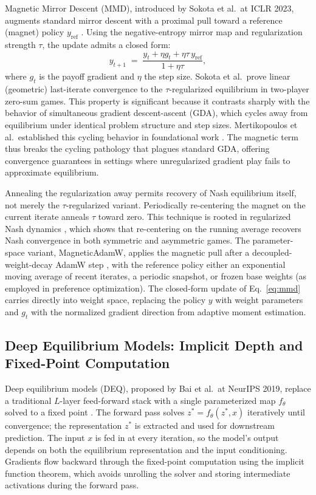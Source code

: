 Magnetic Mirror Descent (MMD), introduced by Sokota et al.\ at ICLR 2023, augments standard mirror descent
with a proximal pull toward a reference (magnet) policy $y_{\mathrm{ref}}$ \citep{Sokota2023}.
Using the negative-entropy mirror map and regularization strength $\tau$, the update admits a closed form:
\begin{equation}
y_{t+1} \;=\; \frac{y_t + \eta g_t + \eta\tau\, y_{\mathrm{ref}}}{1 + \eta\tau},
\label{eq:mmd}
\end{equation}
where $g_t$ is the payoff gradient and $\eta$ the step size.
Sokota et al.\ prove linear (geometric) last-iterate convergence to the $\tau$-regularized equilibrium in
two-player zero-sum games.
This property is significant because it contrasts sharply with the behavior of simultaneous gradient
descent-ascent (GDA), which cycles away from equilibrium under identical problem structure and step sizes.
Mertikopoulos et al.\ established this cycling behavior in foundational work \citep{Mertikopoulos2018}.
The magnetic term thus breaks the cycling pathology that plagues standard GDA, offering convergence guarantees
in settings where unregularized gradient play fails to approximate equilibrium.

Annealing the regularization away permits recovery of Nash equilibrium itself, not merely the
$\tau$-regularized variant.
Periodically re-centering the magnet on the current iterate anneals $\tau$ toward zero.
This technique is rooted in regularized Nash dynamics \citep{Perolat2021}, which shows that re-centering on
the running average recovers Nash convergence in both symmetric and asymmetric games.
The parameter-space variant, MagneticAdamW, applies the magnetic pull after a decoupled-weight-decay AdamW
step \citep{Loshchilov2019}, with the reference policy either an exponential moving average of recent iterates,
a periodic snapshot, or frozen base weights (as employed in preference optimization).
The closed-form update of Eq.~\ref{eq:mmd} carries directly into weight space, replacing the policy $y$ with
weight parameters and $g_t$ with the normalized gradient direction from adaptive moment estimation.

\subsection{Deep Equilibrium Models: Implicit Depth and Fixed-Point Computation}

Deep equilibrium models (DEQ), proposed by Bai et al.\ at NeurIPS 2019, replace a traditional $L$-layer
feed-forward stack with a single parameterized map $f_\theta$ solved to a fixed point \citep{Bai2019}.
The forward pass solves $z^* = f_\theta(z^*, x)$ iteratively until convergence; the representation $z^*$ is
extracted and used for downstream prediction.
The input $x$ is fed in at every iteration, so the model's output depends on both the equilibrium
representation and the input conditioning.
Gradients flow backward through the fixed-point computation using the implicit function theorem, which avoids
unrolling the solver and storing intermediate activations during the forward pass.

